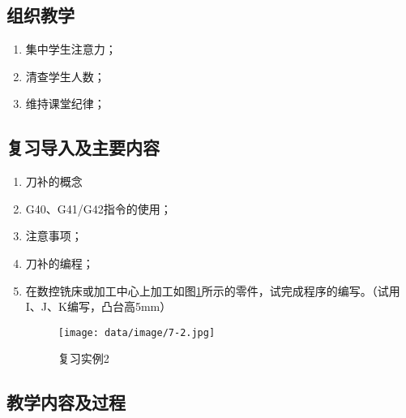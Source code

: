 \jxhj{%
	}

\makeshouye %

\subsection{组织教学}
\begin{enumerate}[\hspace{2em}1、]
	\item 集中学生注意力；
	\item 清查学生人数；
	\item 维持课堂纪律；
\end{enumerate}
\subsection{复习导入及主要内容}
\begin{enumerate}[1、]
\item 刀补的概念
\item G40、G41/G42指令的使用；
\item 注意事项；
\item 刀补的编程；
\item 在数控铣床或加工中心上加工如图\ref{fig:8-1}所示的零件，试完成程序的编写。（试用I、J、K编写，凸台高5mm）

\begin{figure}[h]
	\centering
	\texttt{[image: data/image/7-2.jpg]}
	\caption{复习实例2}
	\label{fig:8-1}
\end{figure}
\end{enumerate}


\subsection{教学内容及过程}

